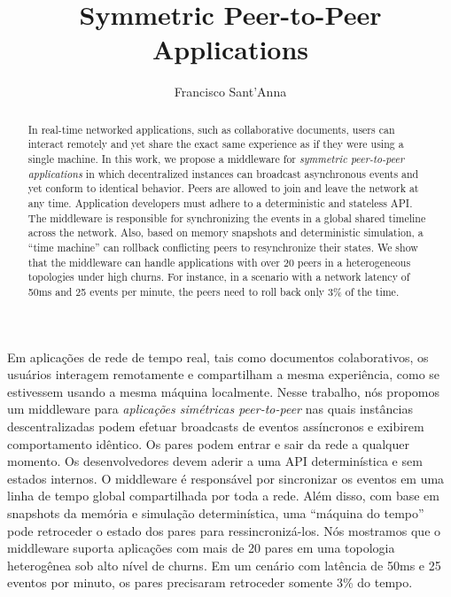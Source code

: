 \documentclass[12pt]{article}
\title{
    Symmetric Peer-to-Peer Applications
}
\author{Francisco Sant'Anna}
\begin{document}
\maketitle

\begin{abstract}
In real-time networked applications, such as collaborative documents, users can
interact remotely and yet share the exact same experience as if they were using
a single machine.
%
In this work, we propose a middleware for \emph{symmetric peer-to-peer
applications} in which decentralized instances can broadcast asynchronous
events and yet conform to identical behavior.
%
Peers are allowed to join and leave the network at any time.
Application developers must adhere to a deterministic and stateless API.
%
The middleware is responsible for synchronizing the events in a global shared
timeline across the network.
Also, based on memory snapshots and deterministic simulation, a ``time machine''
can rollback conflicting peers to resynchronize their states.
%
We show that the middleware can handle applications with over 20 peers in a
heterogeneous topologies under high churns.
For instance, in a scenario with a network latency of 50ms and 25 events per
minute, the peers need to roll back only 3\% of the time.
\end{abstract}

\begin{resumo} 
Em aplicações de rede de tempo real, tais como documentos colaborativos, os
usuários interagem remotamente e compartilham a mesma experiência, como se
estivessem usando a mesma máquina localmente.
%
Nesse trabalho, nós propomos um middleware para \emph{aplicações simétricas
peer-to-peer} nas quais instâncias descentralizadas podem efetuar broadcasts de
eventos assíncronos e exibirem comportamento idêntico.
%
Os pares podem entrar e sair da rede a qualquer momento.
Os desenvolvedores devem aderir a uma API determinística e sem estados
internos.
%
O middleware é responsável por sincronizar os eventos em uma linha de tempo
global compartilhada por toda a rede.
Além disso, com base em snapshots da memória e simulação determinística, uma
``máquina do tempo'' pode retroceder o estado dos pares para ressincronizá-los.
%
Nós mostramos que o middleware suporta aplicações com mais de 20 pares em uma
topologia heterogênea sob alto nível de churns.
Em um cenário com latência de 50ms e 25 eventos por minuto, os pares precisaram
retroceder somente 3\% do tempo.
\end{resumo}
\end{document}
